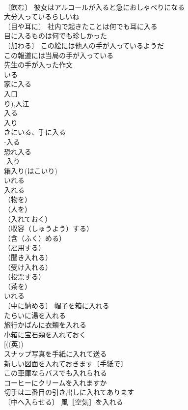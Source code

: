 \documentclass[8pt]{extreport}
\begin{document}
\begin{CJK}{UTF8}{min}
\\	〔飲む〕 彼女はアルコールが入ると急におしゃべりになる 
\\	大分入っているらしいね 
\\	〔目や耳に〕 社内で起きたことは何でも耳に入る 
\\	目に入るものは何でも珍しかった 
\\	〔加わる〕 この絵には他人の手が入っているようだ 
\\	この報道には当局の手が入っている 
\\	先生の手が入った作文 
\\	いる 
\\	家に入る 
\\	入口 
\\	り),入江 
\\	入る 
\\	入り
\\	きにいる、手に入る　
\\	-入る　
\\	恐れ入る　
\\	-入り　
\\	箱入り(はこいり)　
\\	いれる 
\\	入れる	
\\	（物を）
\\	（人を）
\\	（入れておく）
\\	（収容（しゅうよう）する）
\\	（含（ふく）める）
\\	（雇用する）
\\	（聞き入れる）
\\	（受け入れる）
\\	（投票する）
\\	（茶を）
\\	いれる 
\\	〔中に納める〕 帽子を箱に入れる 
\\	たらいに湯を入れる 
\\	旅行かばんに衣類を入れる 
\\	小箱に宝石類を入れておく 
\\	[((英)) 
\\	スナップ写真を手紙に入れて送る 
\\	新しい図面を入れておきます〔手紙で〕 
\\	この車庫ならバスでも入れられる 
\\	コーヒーにクリームを入れますか 
\\	切手は二番目の引き出しに入れてあります 
\\	〔中へ入らせる〕 風［空気］を入れる 

\end{CJK}
\end{document}
